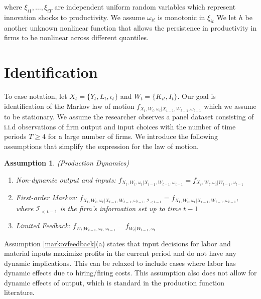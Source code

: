 \documentclass{article}
\newtheorem{assump}{Assumption}[section]
\begin{document}
where $\xi_{i1},\dots, \xi_{iT}$ are independent uniform random variables which represent innovation shocks to productivity. We assume $\omega_{it}$ is monotonic in $\xi_{it}$ We let $h$ be another unknown nonlinear function that allows the persistence in productivity in firms to be nonlinear across different quantiles.

\section{Identification}

To ease notation, let $X_{t}=\{Y_{t}, L_{t}, \iota_{t}\}$ and $W_{t}=\{K_{it}, I_{t}\}$. Our goal is identification of the Markov law of motion $f_{X_{t}, W_{t}, \omega_{t}|X_{t-1}, W_{t-1}, \omega_{t-1}}$ which we assume to be stationary. We assume the researcher observes a panel dataset consisting of i.i.d observations of firm output and input choices with the number of time periods $T\geq 4$ for a large number of firms. We introduce the following assumptions that simplify the expression for the law of motion. 

\begin{assump}(Production Dynamics)\label{markovfeedback}
~
    \begin{enumerate}[label=\alph*)]
        \item \textit{Non-dynamic output and inputs:} $f_{X_{t}, W_{t}, \omega_{t}|X_{t-1}, W_{t-1}, \omega_{t-1}}=f_{X_{t}, W_{t}, \omega_{t}|W_{t-1}, \omega_{t-1}}$
        \item \textit{First-order Markov:} $f_{X_{t}, W_{t}, \omega_{t}|X_{t-1}, W_{t-1}, \omega_{t-1}, \mathcal{I}_{<t-1}}=f_{X_{t}, W_{t}, \omega_{t}|X_{t-1}, W_{t-1}, \omega_{t-1}}$, where $\mathcal{I}_{<t-1}$ is the firm's information set up to time $t-1$
        \item \textit{Limited Feedback:} $f_{W_{t}|W_{t-1}, \omega_{t}, \omega_{t-1}}=f_{W_{t}|W_{t-1}, \omega_{t}}$ 
    \end{enumerate}
\end{assump}

Assumption \eqref{markovfeedback}(a) states that input decisions for labor and material inputs maximize profits in the current period and do not have any dynamic implications. This can be relaxed to include cases where labor has dynamic effects due to hiring/firing costs. This assumption also does not allow for dynamic effects of output, which is standard in the production function literature.\\ 
\end{document}
